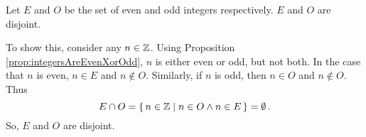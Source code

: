 \guard




\begin{exmp}
\label{exmp:setOfEvenAndOddIntegersAreDisjoint}
  Let $E$ and $O$ be the set of even and odd integers respectively.
  $E$ and $O$ are disjoint.

  To show this, consider any $n\in\mathbb{Z}$.
  Using Proposition \ref{prop:integersAreEvenXorOdd}, $n$ is either even or odd, but not both.
  In the case that $n$ is even, $n\in E$ and $n\not\in O$.
  Similarly, if $n$ is odd, then $n\in O$ and $n\not\in O$.
  Thus \[E\cap O=\left\{\, n\in\mathbb{Z}\mid n\in O \wedge n\in E\,\right\}=\emptyset\,.\]
  So, $E$ and $O$ are disjoint.
\end{exmp}
